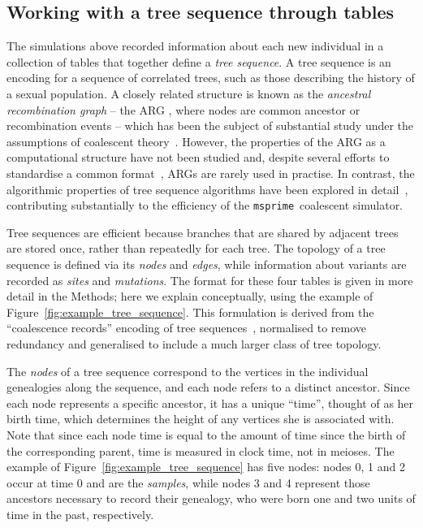 \documentclass{article}
\newcommand{\msprime}{\texttt{msprime}}
\begin{document}



\subsection*{Working with a tree sequence through tables}

The simulations above recorded information about each new individual
in a collection of tables that together define a \emph{tree sequence}.
A {tree sequence} is an encoding for a sequence of correlated trees,
such as those describing the history of a sexual population.
A closely related structure is known as the \emph{ancestral recombination graph} --
the {ARG} \citep{griffiths1991two,griffiths1997ancestral},
where nodes are common ancestor or recombination events --
which has been the subject of substantial study
under the assumptions of coalescent
theory~\citep{wiuf1997number,wiuf1999ancestry,marjoram2006coalescent,wilton2015smc}.
However, the properties of the ARG as a computational structure have not
been studied and, despite several efforts to standardise a common
format~\citep{morin2006netgen,mcgill2013graphml}, %
ARGs are rarely used
in practise. In contrast, the algorithmic properties of tree sequence
algorithms have been explored in detail~\citep{kelleher2016efficient},
contributing substantially to the efficiency of the \msprime\ coalescent simulator.

Tree sequences are efficient because branches that are shared by adjacent trees are stored once,
rather than repeatedly for each tree.
The topology of a tree sequence is defined via its \emph{nodes} and \emph{edges},
while information about variants are recorded as \emph{sites} and \emph{mutations}.
The format for these four tables is given in more detail in the Methods;
here we explain conceptually,
using the example of Figure~\ref{fig:example_tree_sequence}. This formulation
is derived from the ``coalescence records'' encoding of tree
sequences~\citep{kelleher2016efficient}, normalised to remove redundancy
and generalised to include a much larger class of tree topology.

The \emph{nodes} of a tree sequence
correspond to the vertices in the individual genealogies along the sequence,
and each node refers to a distinct ancestor.
Since each node represents a specific ancestor, it has a unique ``time'',
thought of as her birth time, which determines the height of any vertices
she is associated with.
Note that since each node time is equal to the amount of time since the {birth} of the
corresponding parent, time is measured in clock time, not in meioses.
The example of Figure~\ref{fig:example_tree_sequence} has five nodes:
nodes 0, 1 and 2 occur at time 0 and are the \emph{samples},
while nodes 3 and 4 represent those ancestors necessary to record their genealogy,
who were born one and two units of time in the past, respectively.
\end{document}
